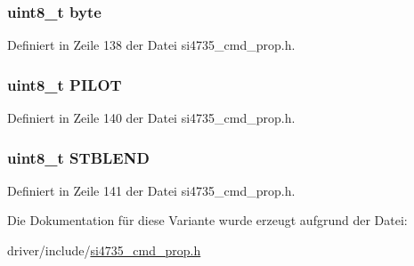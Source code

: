 \subsubsection[{byte}]{\setlength{\rightskip}{0pt plus 5cm}uint8\+\_\+t byte}\label{unionfm__rsq__status__resp3_a96f44d20f1dbf1c8785a7bc99a46164c}


Definiert in Zeile 138 der Datei si4735\+\_\+cmd\+\_\+prop.\+h.

\hypertarget{unionfm__rsq__status__resp3_a4958d1df0f4dc7a3bf46c383663e0739}{}
\subsubsection[{P\+I\+L\+O\+T}]{\setlength{\rightskip}{0pt plus 5cm}uint8\+\_\+t P\+I\+L\+O\+T}\label{unionfm__rsq__status__resp3_a4958d1df0f4dc7a3bf46c383663e0739}


Definiert in Zeile 140 der Datei si4735\+\_\+cmd\+\_\+prop.\+h.

\hypertarget{unionfm__rsq__status__resp3_ad02c06d90cc188a25eba06195f635624}{}
\subsubsection[{S\+T\+B\+L\+E\+N\+D}]{\setlength{\rightskip}{0pt plus 5cm}uint8\+\_\+t S\+T\+B\+L\+E\+N\+D}\label{unionfm__rsq__status__resp3_ad02c06d90cc188a25eba06195f635624}


Definiert in Zeile 141 der Datei si4735\+\_\+cmd\+\_\+prop.\+h.



Die Dokumentation für diese Variante wurde erzeugt aufgrund der Datei\+:\begin{DoxyCompactItemize}
\item 
driver/include/\hyperlink{si4735__cmd__prop_8h}{si4735\+\_\+cmd\+\_\+prop.\+h}\end{DoxyCompactItemize}
